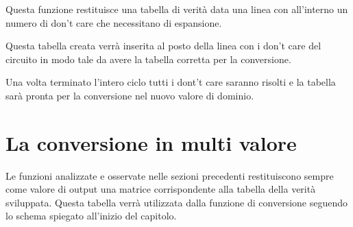 \documentclass[
]{book}
\begin{document}
Questa funzione restituisce una tabella di verità data una linea con all'interno un numero di don't care che necessitano di espansione.

Questa tabella creata verrà inserita al posto della linea con i don't care del circuito in modo tale da avere la tabella corretta per la conversione.

Una volta terminato l'intero ciclo tutti i dont't care saranno risolti e la tabella sarà pronta per la conversione nel nuovo valore di dominio.

\newpage

\hypertarget{la-conversione-in-multi-valore}{%
\section{La conversione in multi valore}\label{la-conversione-in-multi-valore}}

Le funzioni analizzate e osservate nelle sezioni precedenti restituiscono sempre come valore di output una matrice corrispondente alla tabella della verità sviluppata. Questa tabella verrà utilizzata dalla funzione di conversione seguendo lo schema spiegato all'inizio del capitolo.
\end{document}
